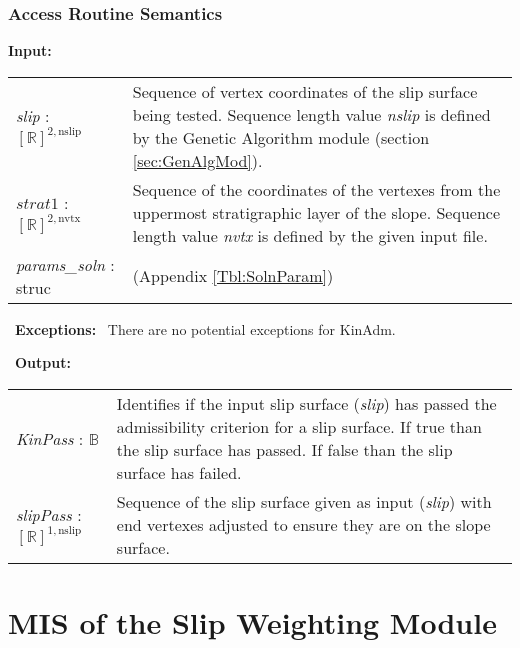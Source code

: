 \documentclass[12pt, titlepage]{article}
\begin{document}
\subsubsection{Access Routine Semantics}
\textbf{Input:}
\renewcommand*{\arraystretch}{1.5}
\begin{longtable}{p{} p{}}
  \textit{slip} : $[\mathbb{R}]^{2,\text{nslip}}$ & Sequence of vertex
  coordinates of the slip surface being tested. Sequence length value
  \textit{nslip} is defined by the Genetic Algorithm module (section
  \ref{sec:GenAlgMod}).\\
  
  $\textit{strat1}$ : $[\mathbb{R}]^{2,\text{nvtx}}$ & Sequence of
  the coordinates of the vertexes from the uppermost stratigraphic
  layer of the slope. Sequence length value \textit{nvtx} is defined
  by the given input file. \\
  
  \textit{params\_soln} : struc & (Appendix
  \ref{Tbl:SolnParam})
\end{longtable}

~\newline\noindent \textbf{Exceptions:} ~\newline\noindent There are
no potential exceptions for KinAdm.

~\newline\noindent \textbf{Output:}
\renewcommand{\arraystretch}{1.5}
\begin{longtable}{p{} p{}}
  \textit{KinPass} : $\mathbb{B}$ & Identifies if the input slip
  surface (\textit{slip}) has passed the admissibility criterion for a
  slip surface. If true than the slip surface has passed. If false
  than the slip surface has failed. \\

  \textit{slipPass} : $[\mathbb{R}]^{1,\text{nslip}}$ & Sequence of
  the slip surface given as input (\textit{slip}) with end vertexes
  adjusted to ensure they are on the slope surface.
\end{longtable}


\section{MIS of the Slip Weighting
  Module} \label{sec:WeightMod}
\end{document}
